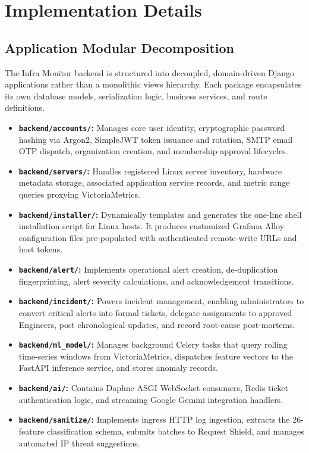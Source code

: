 \chapter{Implementation Details}

\section{Application Modular Decomposition}
The Infra Monitor backend is structured into decoupled, domain-driven Django applications rather than a monolithic views hierarchy. Each package encapsulates its own database models, serialization logic, business services, and route definitions.

\begin{itemize}
  \item \textbf{\texttt{backend/accounts/}:} Manages core user identity, cryptographic password hashing via Argon2, SimpleJWT token issuance and rotation, SMTP email OTP dispatch, organization creation, and membership approval lifecycles.
  
  \item \textbf{\texttt{backend/servers/}:} Handles registered Linux server inventory, hardware metadata storage, associated application service records, and metric range queries proxying VictoriaMetrics.
  
  \item \textbf{\texttt{backend/installer/}:} Dynamically templates and generates the one-line shell installation script for Linux hosts. It produces customized Grafana Alloy configuration files pre-populated with authenticated remote-write URLs and host tokens.
  
  \item \textbf{\texttt{backend/alert/}:} Implements operational alert creation, de-duplication fingerprinting, alert severity calculations, and acknowledgement transitions.
  
  \item \textbf{\texttt{backend/incident/}:} Powers incident management, enabling administrators to convert critical alerts into formal tickets, delegate assignments to approved Engineers, post chronological updates, and record root-cause post-mortems.
  
  \item \textbf{\texttt{backend/ml\_model/}:} Manages background Celery tasks that query rolling time-series windows from VictoriaMetrics, dispatches feature vectors to the FastAPI inference service, and stores anomaly records.
  
  \item \textbf{\texttt{backend/ai/}:} Contains Daphne ASGI WebSocket consumers, Redis ticket authentication logic, and streaming Google Gemini integration handlers.
  
  \item \textbf{\texttt{backend/sanitize/}:} Implements ingress HTTP log ingestion, extracts the 26-feature classification schema, submits batches to Request Shield, and manages automated IP threat suggestions.
\end{itemize}

